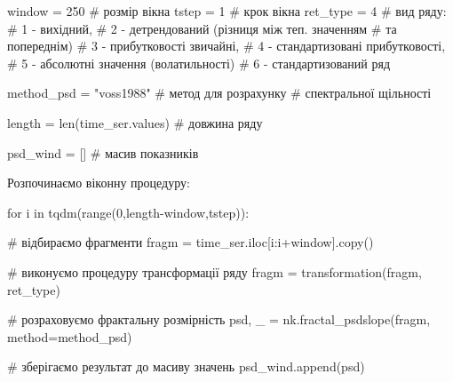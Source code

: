 \documentclass[
  letterpaper,
]{report}
\newenvironment{Shaded}{\begin{snugshade}}{\end{snugshade}}
\newcommand{\BuiltInTok}[1]{\textcolor[rgb]{0.00,0.23,0.31}{#1}}
\newcommand{\CommentTok}[1]{\textcolor[rgb]{0.37,0.37,0.37}{#1}}
\newcommand{\ControlFlowTok}[1]{\textcolor[rgb]{0.00,0.23,0.31}{#1}}
\newcommand{\DecValTok}[1]{\textcolor[rgb]{0.68,0.00,0.00}{#1}}
\newcommand{\KeywordTok}[1]{\textcolor[rgb]{0.00,0.23,0.31}{#1}}
\newcommand{\NormalTok}[1]{\textcolor[rgb]{0.00,0.23,0.31}{#1}}
\newcommand{\OperatorTok}[1]{\textcolor[rgb]{0.37,0.37,0.37}{#1}}
\newcommand{\StringTok}[1]{\textcolor[rgb]{0.13,0.47,0.30}{#1}}
\begin{document}
\begin{Shaded}
\begin{Highlighting}[]
\NormalTok{window }\OperatorTok{=} \DecValTok{250}    \CommentTok{\# розмір вікна}
\NormalTok{tstep }\OperatorTok{=} \DecValTok{1}       \CommentTok{\# крок вікна}
\NormalTok{ret\_type }\OperatorTok{=} \DecValTok{4}    \CommentTok{\# вид ряду: }
                \CommentTok{\# 1 {-} вихідний, }
                \CommentTok{\# 2 {-} детрендований (різниця між теп. значенням }
                                                \CommentTok{\# та попереднім)}
                \CommentTok{\# 3 {-} прибутковості звичайні, }
                \CommentTok{\# 4 {-} стандартизовані прибутковості, }
                \CommentTok{\# 5 {-} абсолютні значення (волатильності)}
                \CommentTok{\# 6 {-} стандартизований ряд}

\NormalTok{method\_psd }\OperatorTok{=} \StringTok{"voss1988"}        \CommentTok{\# метод для розрахунку}
                               \CommentTok{\# спектральної щільності}

\NormalTok{length }\OperatorTok{=} \BuiltInTok{len}\NormalTok{(time\_ser.values)  }\CommentTok{\# довжина ряду}

\NormalTok{psd\_wind }\OperatorTok{=}\NormalTok{ []                  }\CommentTok{\# масив показників }
\end{Highlighting}
\end{Shaded}

Розпочинаємо віконну процедуру:

\begin{Shaded}
\begin{Highlighting}[]
\ControlFlowTok{for}\NormalTok{ i }\KeywordTok{in}\NormalTok{ tqdm(}\BuiltInTok{range}\NormalTok{(}\DecValTok{0}\NormalTok{,length}\OperatorTok{{-}}\NormalTok{window,tstep)):}
    
    \CommentTok{\# відбираємо фрагменти}
\NormalTok{    fragm }\OperatorTok{=}\NormalTok{ time\_ser.iloc[i:i}\OperatorTok{+}\NormalTok{window].copy()  }

    \CommentTok{\# виконуємо процедуру трансформації ряду }
\NormalTok{    fragm }\OperatorTok{=}\NormalTok{ transformation(fragm, ret\_type)}

    \CommentTok{\# розраховуємо фрактальну розмірність }
\NormalTok{    psd, \_ }\OperatorTok{=}\NormalTok{ nk.fractal\_psdslope(fragm, method}\OperatorTok{=}\NormalTok{method\_psd)}

    \CommentTok{\# зберігаємо результат до масиву значень}
\NormalTok{    psd\_wind.append(psd)}
\end{Highlighting}
\end{Shaded}
\end{document}

